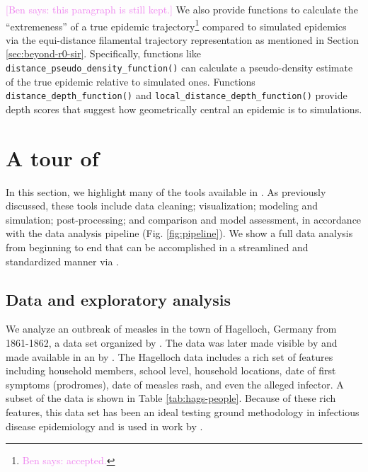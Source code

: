 \documentclass[
  shortnames]{jss}
\begin{document}
\textcolor{violet}{[Ben says: this paragraph is still kept.]} We also
provide functions to calculate the ``extremeness'' of a true epidemic
trajectory\footnote{\textcolor{violet}{Ben says: accepted.}} compared to
simulated epidemics via the equi-distance filamental trajectory
representation as mentioned in Section \ref{sec:beyond-r0-sir}.
Specifically, functions like
\texttt{distance\_pseudo\_density\_function()} can calculate a
pseudo-density estimate of the true epidemic relative to simulated ones.
Functions \texttt{distance\_depth\_function()} and
\texttt{local\_distance\_depth\_function()} provide depth scores that
suggest how geometrically central an epidemic is to simulations.

\section[Tour]{A tour of }\label{sec:tour}

In this section, we highlight many of the tools available in
. As previously discussed, these tools include data
cleaning; visualization; modeling and simulation; post-processing; and
comparison and model assessment, in accordance with the data analysis
pipeline (Fig. \ref{fig:pipeline}). We show a full data analysis from
beginning to end that can be accomplished in a streamlined and
standardized manner via .

\subsection{Data and exploratory analysis}

We analyze an outbreak of measles in the town of Hagelloch, Germany from
1861-1862, a data set organized by \cite{pfeilsticker1863}. The data was
later made visible by \cite{oesterle1992} and made available in an
 by \cite{surveillance2017}. The Hagelloch data includes a
rich set of features including household members, school level,
household locations, date of first symptoms (prodromes), date of measles
rash, and even the alleged infector. A subset of the data is shown in
Table \ref{tab:hags-people}. Because of these rich features, this data
set has been an ideal testing ground methodology in infectious disease
epidemiology and is used in work by
\cite{Neal2004,britton2011,groendyke2012,becker2016}.
\end{document}
